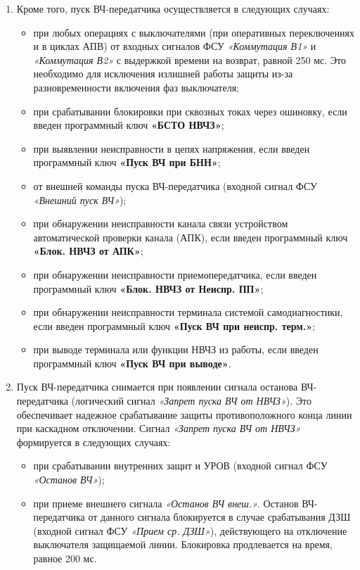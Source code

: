 \begin{enumerate}[label=\arabic{section}.\arabic{subsection}.\arabic{enumi}, labelsep=4pt, leftmargin=0pt, itemindent=57pt, itemsep=0pt, parsep=5pt]
\begin{enumerate}[label=\arabic{section}.\arabic{subsection}.\arabic{enumi}.\arabic*, labelsep=4pt, leftmargin=0em, itemindent=65pt, parsep=0pt]
\item
Кроме того, пуск ВЧ-передатчика осуществляется в следующих случаях:
\begin{itemize} 
\item при любых операциях с выключателями (при оперативных переключениях и в циклах АПВ) от входных сигналов ФСУ \textit{«Коммутация В1»} и \textit{«Коммутация В2»} с выдержкой времени на возврат, равной 250 мс.
Это необходимо для исключения излишней работы защиты из-за разновременности включения фаз выключателя;
\item при срабатывании блокировки при сквозных токах через ошиновку, если введен программный ключ \textbf{«БСТО НВЧЗ»};
\item при выявлении неисправности в цепях напряжения, если введен программный ключ \textbf{«Пуск ВЧ при БНН»};
\item от внешней команды пуска ВЧ-передатчика (входной сигнал ФСУ \textit{«Внешний пуск ВЧ»});
\item при обнаружении неисправности канала связи устройством автоматической проверки канала (АПК), если введен программный ключ \textbf{«Блок. НВЧЗ от АПК»};
\item при обнаружении неисправности приемопередатчика, если введен программный ключ \textbf{«Блок. НВЧЗ от Неиспр. ПП»};
\item при обнаружении неисправности терминала системой самодиагностики, если введен программный ключ \textbf{«Пуск ВЧ при неиспр. терм.»};
\item при выводе терминала или функции НВЧЗ из работы, если введен программный ключ \textbf{«Пуск ВЧ при выводе»}.
\end{itemize}

\item
Пуск ВЧ-передатчика снимается при появлении сигнала останова ВЧ-передатчика (логический сигнал \textit{«Запрет пуска ВЧ от НВЧЗ»}).
Это обеспечивает надежное срабатывание защиты противоположного конца линии при каскадном отключении.
Сигнал \textit{«Запрет пуска ВЧ от НВЧЗ»} формируется в следующих случаях:
\begin{itemize}
\item при срабатывании внутренних защит и УРОВ (входной сигнал ФСУ \textit{«Останов ВЧ»});
\item при приеме внешнего сигнала \textit{«Останов ВЧ внеш.»}.
Останов ВЧ-передатчика от данного сигнала блокируется в случае срабатывания ДЗШ (входной сигнал ФСУ \textit{«Прием ср. ДЗШ»}), действующего на отключение выключателя защищаемой линии.
Блокировка продлевается на время, равное 200 мс. 
\end{itemize}


\end{enumerate}
\end{enumerate}
